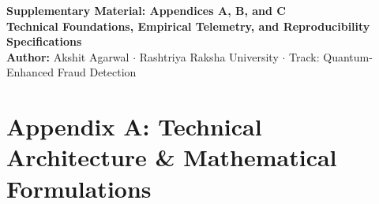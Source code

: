 \documentclass[10pt,a4paper]{article}
\begin{document}
\fontsize{10.25pt}{12.25pt}\selectfont
\setlength{\abovedisplayskip}{2pt}
\setlength{\belowdisplayskip}{2pt}
\setlength{\abovedisplayshortskip}{1pt}
\setlength{\belowdisplayshortskip}{1pt}


\begin{center}
{\LARGE\textbf{\color{hsbcnavy}Supplementary Material: Appendices A, B, and C}}\\[2pt]
{\large\color{darkslate}\textbf{Technical Foundations, Empirical Telemetry, and Reproducibility Specifications}}\\[2.5pt]
{\color{darkslate}\textbf{Author:} Akshit Agarwal $\cdot$ Rashtriya Raksha University $\cdot$ Track: Quantum-Enhanced Fraud Detection}
\end{center}
\vspace{-6pt}

\section*{Appendix A: Technical Architecture \& Mathematical Formulations}
\end{document}

